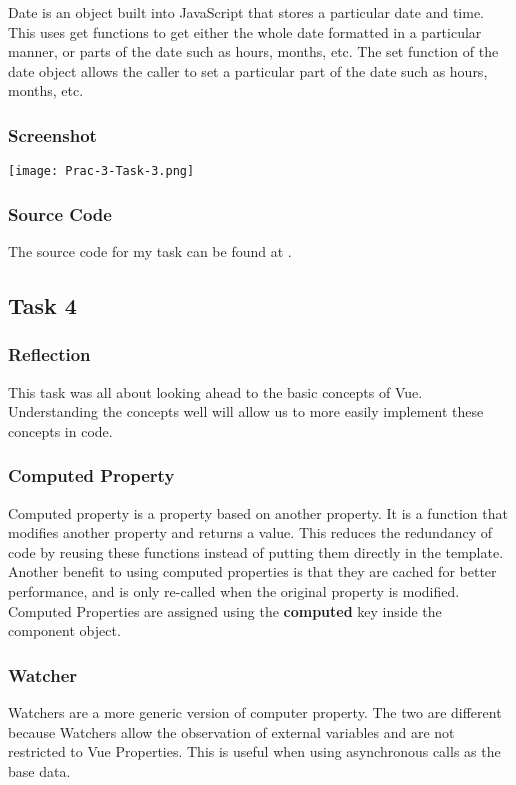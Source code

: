 \documentclass[portfolio.tex]{subfiles}
\begin{document}
				Date is an object built into JavaScript that stores a particular date and time. This uses get functions to get either the whole date formatted in a particular manner, or parts of the date such as hours, months, etc. The set function of the date object allows the caller to set a particular part of the date such as hours, months, etc.

				\subsubsection{Screenshot}
			 	\texttt{[image: Prac-3-Task-3.png]}

				\subsubsection{Source Code}
				The source code for my task can be found at .

			\subsection{Task 4}
				\subsubsection{Reflection}
					This task was all about looking ahead to the basic concepts of Vue. Understanding the concepts well will allow us to more easily implement these concepts in code.

				\subsubsection{Computed Property}
					Computed property is a property based on another property. It is a function that modifies another property and returns a value. This reduces the redundancy of code by reusing these functions instead of putting them directly in the template.  Another benefit to using computed properties is that they are cached for better performance, and is only re-called when the original property is modified.\\

					\hspace{-0.5cm}Computed Properties are assigned using the \textbf{computed} key inside the component object. \autocite{vue-computed}

				\subsubsection{Watcher}
					Watchers are a more generic version of computer property. The two are different because Watchers allow the observation of external variables and are not restricted to Vue Properties. This is useful when using asynchronous calls as the base data. \\
\end{document}
